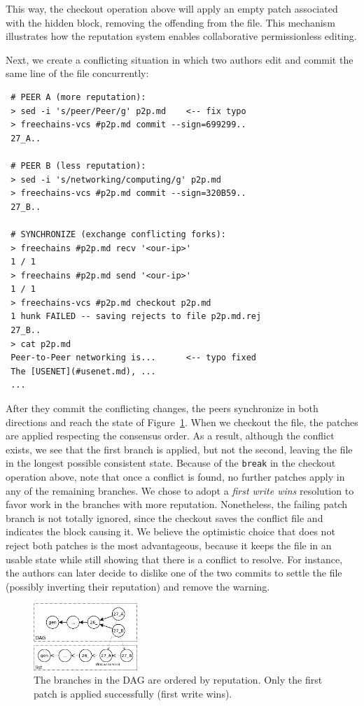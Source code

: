 \documentclass[10pt,journal,compsoc]{IEEEtran}
\begin{document}
This way, the checkout operation above will apply an empty patch associated
with the hidden block, removing the offending from the file.
This mechanism illustrates how the reputation system enables collaborative
permissionless editing.

Next, we create a conflicting situation in which two authors edit and commit
the same line of the file concurrently:

{\footnotesize
\begin{verbatim}
 # PEER A (more reputation):
 > sed -i 's/peer/Peer/g' p2p.md    <-- fix typo
 > freechains-vcs #p2p.md commit --sign=699299..
 27_A..

 # PEER B (less reputation):
 > sed -i 's/networking/computing/g' p2p.md
 > freechains-vcs #p2p.md commit --sign=320B59..
 27_B..

 # SYNCHRONIZE (exchange conflicting forks):
 > freechains #p2p.md recv '<our-ip>'
 1 / 1
 > freechains #p2p.md send '<our-ip>'
 1 / 1
 > freechains-vcs #p2p.md checkout p2p.md
 1 hunk FAILED -- saving rejects to file p2p.md.rej
 27_B..
 > cat p2p.md
 Peer-to-Peer networking is...      <-- typo fixed
 The [USENET](#usenet.md), ...
 ...
\end{verbatim}
}

After they commit the conflicting changes, the peers synchronize in both
directions and reach the state of Figure~\ref{fig.conflict}.
When we checkout the file, the patches are applied respecting the consensus
order.
As a result, although the conflict exists, we see that the first branch is
applied, but not the second, leaving the file in the longest possible
consistent state.
%
Because of the \texttt{break} in the checkout operation above, note that once a
conflict is found, no further patches apply in any of the remaining branches.
%
We chose to adopt a \emph{first write wins} resolution to favor work in the
branches with more reputation.
Nonetheless, the failing patch branch is not totally ignored, since the
checkout saves the conflict file and indicates the block causing it.
%
We believe the optimistic choice that does not reject both patches is the most
advantageous, because it keeps the file in an usable state while still showing
that there is a conflict to resolve.
For instance, the authors can later decide to dislike one of the two commits to
settle the file (possibly inverting their reputation) and remove the warning.

\begin{figure}
\centering
\includegraphics[width=0.35\textwidth]{conflict.png}
\caption{
    The branches in the DAG are ordered by reputation.
    Only the first patch is applied successfully (first write wins).
}
\label{fig.conflict}
\end{figure}
\end{document}
